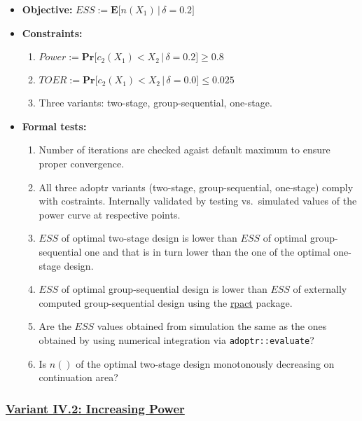 \documentclass[]{book}
\providecommand{\tightlist}{%
  \setlength{\itemsep}{0pt}\setlength{\parskip}{0pt}}
\begin{document}
\begin{itemize}
\tightlist
\item
  \textbf{Objective:} \(ESS := \boldsymbol{E}\big[n(X_1)\,|\,\delta=0.2\big]\)
\item
  \textbf{Constraints:}

  \begin{enumerate}
  \def\labelenumi{\arabic{enumi}.}
  \tightlist
  \item
    \(Power := \boldsymbol{Pr}\big[c_2(X_1) < X_2\,|\,\delta=0.2\big] \geq 0.8\)
  \item
    \(TOER := \boldsymbol{Pr}\big[c_2(X_1) < X_2\,|\,\delta=0.0\big] \leq 0.025\)
  \item
    Three variants: two-stage, group-sequential, one-stage.
  \end{enumerate}
\item
  \textbf{Formal tests:}

  \begin{enumerate}
  \def\labelenumi{\arabic{enumi}.}
  \tightlist
  \item
    Number of iterations are checked agaist default maximum to ensure proper
    convergence.
  \item
    All three adoptr variants (two-stage, group-sequential, one-stage)
    comply with costraints. Internally validated by testing vs.~simulated
    values of the power curve at respective points.
  \item
    \(ESS\) of optimal two-stage design is lower than \(ESS\) of optimal
    group-sequential one and that is in turn lower than the one of the
    optimal one-stage design.
  \item
    \(ESS\) of optimal group-sequential design is lower than \(ESS\) of
    externally computed group-sequential design using the \href{https://rpact.org/}{rpact} package.
  \item
    Are the \(ESS\) values obtained from simulation the same as the ones
    obtained by using numerical integration via \texttt{adoptr::evaluate}?
  \item
    Is \(n()\) of the optimal two-stage design monotonously decreasing on
    continuation area?
  \end{enumerate}
\end{itemize}

\hypertarget{variant-iv.2-increasing-power}{%
\subsubsection{\texorpdfstring{\protect\hyperlink{variantIV_2}{Variant IV.2: Increasing Power}}{Variant IV.2: Increasing Power}}\label{variant-iv.2-increasing-power}}
\end{document}
